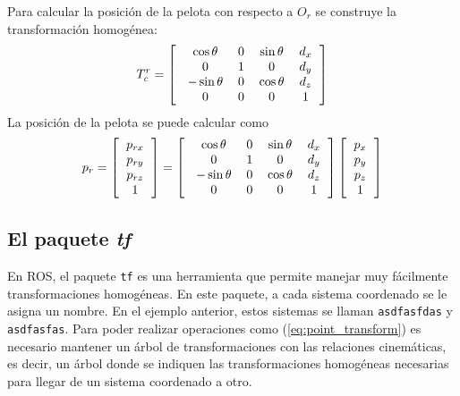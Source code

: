 \documentclass[letterpaper,12pt]{article}
\begin{document}
Para calcular la posición de la pelota con respecto a $O_r$ se construye la transformación homogénea:
\begin{equation}T_c^r = \left[\
  \begin{tabular}{cccc}
      $\cos\theta$ & 0 & $\sin\theta$ & $d_x$\\
      0 & 1 & 0 & $d_y$\\
      $-\sin\theta$ & 0 & $\cos\theta$ & $d_z$\\
      0 & 0 & 0 & 1
  \end{tabular}\right]
\end{equation}
La posición de la pelota se puede calcular como
\label{eq:transform}
\begin{equation}
  p_r =\left[\begin{tabular}{c}$p_{rx}$\\$p_{ry}$\\$p_{rz}$\\1\end{tabular}\right]
= \left[\
  \begin{tabular}{cccc}
      $\cos\theta$ & 0 & $\sin\theta$ & $d_x$\\
      0 & 1 & 0 & $d_y$\\
      $-\sin\theta$ & 0 & $\cos\theta$ & $d_z$\\
      0 & 0 & 0 & 1
  \end{tabular}\right]
\left[\begin{tabular}{c}$p_{x}$\\$p_{y}$\\$p_{z}$\\1\end{tabular}\right]
\label{eq:point_transform}
\end{equation}

\subsection{El paquete \textit{tf}}
En ROS, el paquete \texttt{tf} es una herramienta que permite manejar muy fácilmente transformaciones homogéneas. En este paquete, a cada sistema coordenado se le asigna un nombre. En el ejemplo anterior, estos sistemas se llaman \texttt{asdfasfdas} y \texttt{asdfasfas}. Para poder realizar operaciones como (\ref{eq:point_transform}) es necesario mantener un árbol de transformaciones con las relaciones cinemáticas, es decir, un árbol donde se indiquen las transformaciones homogéneas necesarias para llegar de un sistema coordenado a otro.
\end{document}
